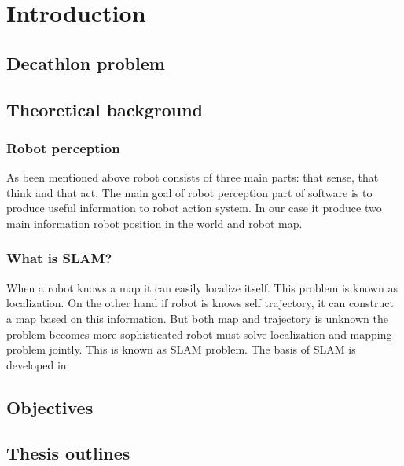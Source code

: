 \chapter{Introduction}
\section{Decathlon problem}
\section{Theoretical background}
\subsection{Robot perception}
As been mentioned above robot consists of three main parts: that sense, that think and that act.
The main goal of robot perception part of software is to produce useful information to robot action system. In our case it produce two main information robot position in the world and robot map.
\subsection{What is SLAM?}
When a robot knows a map it can easily localize itself. This problem is known as localization. On the other hand if robot is knows self trajectory, it can construct a map based on this information. But both map and trajectory is unknown the problem becomes more sophisticated robot must solve localization and mapping problem jointly. This is known as SLAM problem. 
The basis of SLAM is developed in 
% 
\section{Objectives}
\section{Thesis outlines}